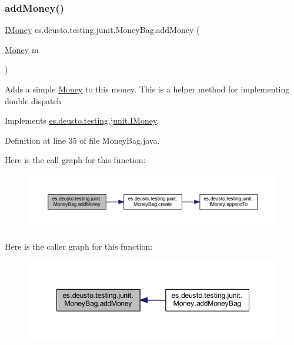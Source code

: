 \subsubsection{\texorpdfstring{add\+Money()}{addMoney()}}
{\footnotesize\ttfamily \hyperlink{interfacees_1_1deusto_1_1testing_1_1junit_1_1_i_money}{I\+Money} es.\+deusto.\+testing.\+junit.\+Money\+Bag.\+add\+Money (\begin{DoxyParamCaption}\item[{\hyperlink{classes_1_1deusto_1_1testing_1_1junit_1_1_money}{Money}}]{m }\end{DoxyParamCaption})}

Adds a simple \hyperlink{classes_1_1deusto_1_1testing_1_1junit_1_1_money}{Money} to this money. This is a helper method for implementing double dispatch 

Implements \hyperlink{interfacees_1_1deusto_1_1testing_1_1junit_1_1_i_money_aab8d4be667a542a8aa1380eb2b6e4257}{es.\+deusto.\+testing.\+junit.\+I\+Money}.



Definition at line 35 of file Money\+Bag.\+java.

Here is the call graph for this function\+:
\nopagebreak
\begin{figure}[H]
\begin{center}
\leavevmode
\includegraphics[width=350pt]{classes_1_1deusto_1_1testing_1_1junit_1_1_money_bag_a06ecedbf53ba09d34276fe177e3169bc_cgraph}
\end{center}
\end{figure}
Here is the caller graph for this function\+:
\nopagebreak
\begin{figure}[H]
\begin{center}
\leavevmode
\includegraphics[width=348pt]{classes_1_1deusto_1_1testing_1_1junit_1_1_money_bag_a06ecedbf53ba09d34276fe177e3169bc_icgraph}
\end{center}
\end{figure}
\mbox{\label{classes_1_1deusto_1_1testing_1_1junit_1_1_money_bag_ab329e6a2811b83a2b1670b79be92249d}} 

